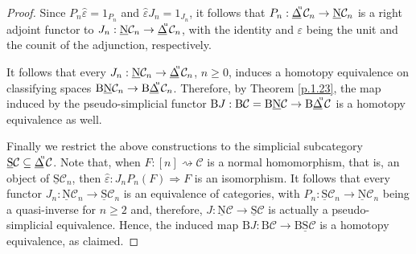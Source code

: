 \documentclass[]{amsart}
\begin{document}
\begin{proof}
Since $ P_n\widehat{\varepsilon}=1_{P_n}$ and $\widehat{\varepsilon} J_n=1_{J_n}$, it follows that
$P_n:{\ensuremath{\underline{\Delta}}}\hspace{-3pt}^{^\mathrm{u}}{\ensuremath{\mathcal{C}}}_n\to {\ensuremath{\underline{\mathrm{N}}}}{\ensuremath{\mathcal{C}}}_n $ is a right adjoint functor to
$J_n:{\ensuremath{\underline{\mathrm{N}}}}{\ensuremath{\mathcal{C}}}_n \to {\ensuremath{\underline{\Delta}}}\hspace{-3pt}^{^\mathrm{u}}{\ensuremath{\mathcal{C}}}_n$, with the identity and $\varepsilon$
being the unit and the counit of the adjunction, respectively.

It follows that every $J_n:{\ensuremath{\underline{\mathrm{N}}}}{\ensuremath{\mathcal{C}}}_n \to {\ensuremath{\underline{\Delta}}}\hspace{-3pt}^{^\mathrm{u}}{\ensuremath{\mathcal{C}}}_n$, $n\geq 0$, induces
a homotopy equivalence
 on classifying spaces ${\ensuremath{\mathrm{B}}}{\ensuremath{\underline{\mathrm{N}}}}{\ensuremath{\mathcal{C}}}_n\to {\ensuremath{\mathrm{B}}} {\ensuremath{\underline{\Delta}}}\hspace{-3pt}^{^\mathrm{u}}{\ensuremath{\mathcal{C}}}_n$. Therefore, by Theorem
  \ref{p.1.23}, the map induced by the pseudo-simplicial functor
   ${\ensuremath{\mathrm{B}}} J:{\ensuremath{\mathrm{B}}}{\ensuremath{\mathcal{C}}}={\ensuremath{\mathrm{B}}}{\ensuremath{\underline{\mathrm{N}}}}{\ensuremath{\mathcal{C}}}\to {\ensuremath{\mathrm{B}}} {\ensuremath{\underline{\Delta}}}\hspace{-3pt}^{^\mathrm{u}}{\ensuremath{\mathcal{C}}}$ is a homotopy equivalence as well.

Finally we restrict the above constructions to the simplicial subcategory
$\underline{\mathrm{S}}{\ensuremath{\mathcal{C}}}\subseteq {\ensuremath{\underline{\Delta}}}\hspace{-3pt}^{^\mathrm{u}}{\ensuremath{\mathcal{C}}}$. Note that, when
 $F:[n]\rightsquigarrow {\ensuremath{\mathcal{C}}}$ is a normal homomorphism, that is, an object of $\underline{\mathrm{S}}{\ensuremath{\mathcal{C}}}_n$, then
 $\widehat{\varepsilon} :J_nP_n(F)\Rightarrow F$ is an isomorphism. It follows that every
 functor $J_n:{\ensuremath{\underline{\mathrm{N}}}}{\ensuremath{\mathcal{C}}}_n\to \underline{\mathrm{S}}{\ensuremath{\mathcal{C}}}_n$ is  an equivalence of categories, with
   $P_n:\underline{\mathrm{S}}{\ensuremath{\mathcal{C}}}_n\to {\ensuremath{\underline{\mathrm{N}}}}{\ensuremath{\mathcal{C}}}_n$ being a quasi-inverse for $n\geq 2$ and,
   therefore,
    $J: {\ensuremath{\underline{\mathrm{N}}}}{\ensuremath{\mathcal{C}}} \to \underline{\mathrm{S}}{\ensuremath{\mathcal{C}}}$ is actually a pseudo-simplicial equivalence. Hence, the induced map
    ${\ensuremath{\mathrm{B}}} J:{\ensuremath{\mathrm{B}}}{\ensuremath{\mathcal{C}}}\to {\ensuremath{\mathrm{B}}} \underline{\mathrm{S}}{\ensuremath{\mathcal{C}}}$ is a homotopy equivalence, as claimed.
\end{proof}
\end{document}
